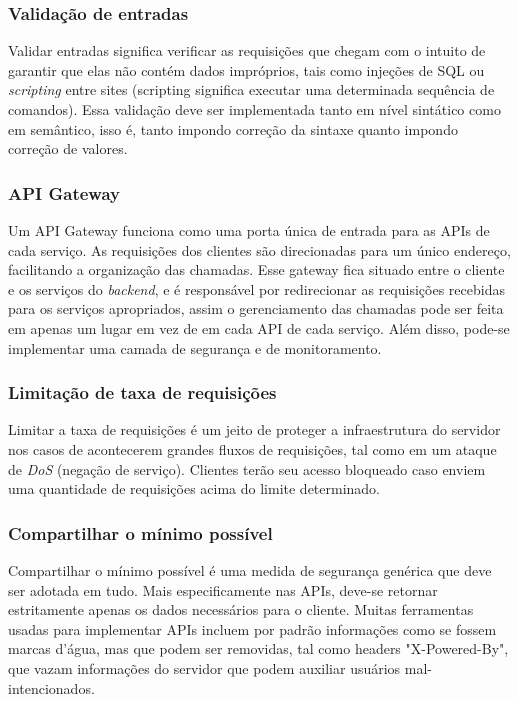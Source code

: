 \subsubsection*{Validação de entradas}

Validar entradas significa verificar as requisições que chegam com o intuito de garantir que elas não contém dados impróprios, tais como injeções de SQL ou \emph{scripting} entre sites (scripting significa executar uma determinada sequência de comandos). Essa validação deve ser implementada tanto em nível sintático como em semântico, isso é, tanto impondo correção da sintaxe quanto impondo correção de valores. \cite{rapidAPI-security}

\subsubsection*{API Gateway}

Um API Gateway funciona como uma porta única de entrada para as APIs de cada serviço. As requisições dos clientes são direcionadas para um único endereço, facilitando a organização das chamadas. Esse gateway fica situado entre o cliente e os serviços do \emph{backend}, e é responsável por redirecionar as requisições recebidas para os serviços apropriados, assim o gerenciamento das chamadas pode ser feita em apenas um lugar em vez de em cada API de cada serviço. Além disso, pode-se implementar uma camada de segurança e de monitoramento. \cite{rapidAPI-security}

\subsubsection*{Limitação de taxa de requisições}

Limitar a taxa de requisições é um jeito de proteger a infraestrutura do servidor nos casos de acontecerem grandes fluxos de requisições, tal como em um ataque de \emph{DoS} (negação de serviço). Clientes terão seu acesso bloqueado caso enviem uma quantidade de requisições acima do limite determinado. \cite{rapidAPI-security}

\subsubsection*{Compartilhar o mínimo possível}

Compartilhar o mínimo possível é uma medida de segurança genérica que deve ser adotada em tudo. Mais especificamente nas APIs, deve-se retornar estritamente apenas os dados necessários para o cliente. Muitas ferramentas usadas para implementar APIs incluem por padrão informações como se fossem marcas d'água, mas que podem ser removidas, tal como headers "X-Powered-By", que vazam informações do servidor que podem auxiliar usuários mal-intencionados. \cite{rapidAPI-security}

